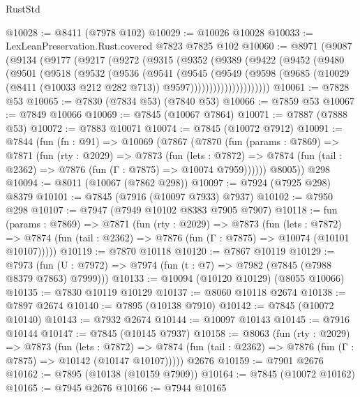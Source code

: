 \begin{lexlean}{RustStd}
\begin{coremodule}
@10028 := @8411 (@7978 @102)
@10029 := @10026 @10028
@10033 := LexLeanPreservation.Rust.covered @7823 @7825 @102
@10060 := @8971
    (@9087
      (@9134
        (@9177
          (@9217
            (@9272
              (@9315
                (@9352
                  (@9389
                    (@9422
                      (@9452
                        (@9480
                          (@9501
                            (@9518
                              (@9532
                                (@9536
                                  (@9541
                                    (@9545
                                      (@9549
                                        (@9598
                                          (@9685
                                            (@10029
                                              (@8411 (@10033 @212 @282 @713))
                                              @9597)))))))))))))))))))))
@10061 := @7828 @53
@10065 := @7830 (@7834 @53) (@7840 @53)
@10066 := @7859 @53
@10067 := @7849 @10066
@10069 := @7845 (@10067 @7864)
@10071 := @7887 (@7888 @53)
@10072 := @7883 @10071
@10074 := @7845 (@10072 @7912)
@10091 := @7844
    (fun (fn : @91) =>
    @10069
      (@7867
        (@7870
          (fun (params : @7869) =>
          @7871
            (fun (rty : @2029) =>
            @7873
              (fun (lets : @7872) =>
              @7874 (fun (tail : @2362) => @7876 (fun (Γ : @7875) => @10074 @7959))))))
        @8005))
    @298
@10094 := @8011 (@10067 (@7862 @298))
@10097 := @7924 (@7925 @298) @8379
@10101 := @7845 (@7916 (@10097 @7933) @7937)
@10102 := @7950 @298
@10107 := @7947 (@7949 @10102 @8383 @7905 @7907)
@10118 := fun (params : @7869) =>
  @7871
    (fun (rty : @2029) =>
    @7873
      (fun (lets : @7872) =>
      @7874 (fun (tail : @2362) => @7876 (fun (Γ : @7875) => @10074 (@10101 @10107)))))
@10119 := @7870 @10118
@10120 := @7867 @10119
@10129 := @7973 (fun (U : @7972) => @7974 (fun (t : @7) => @7982 (@7845 (@7988 @8379 @7863) @7999)))
@10133 := @10094 (@10120 @10129) (@8055 @10066)
@10135 := @7830 @10119 @10129
@10137 := @8060 @10118 @2674
@10138 := @7897 @2674
@10140 := @7895 (@10138 @7910)
@10142 := @7845 (@10072 @10140)
@10143 := @7932 @2674
@10144 := @10097 @10143
@10145 := @7916 @10144
@10147 := @7845 (@10145 @7937)
@10158 := @8063
    (fun (rty : @2029) =>
    @7873
      (fun (lets : @7872) =>
      @7874 (fun (tail : @2362) => @7876 (fun (Γ : @7875) => @10142 (@10147 @10107)))))
    @2676
@10159 := @7901 @2676
@10162 := @7895 (@10138 (@10159 @7909))
@10164 := @7845 (@10072 @10162)
@10165 := @7945 @2676
@10166 := @7944 @10165

\end{coremodule}
\end{lexlean}

